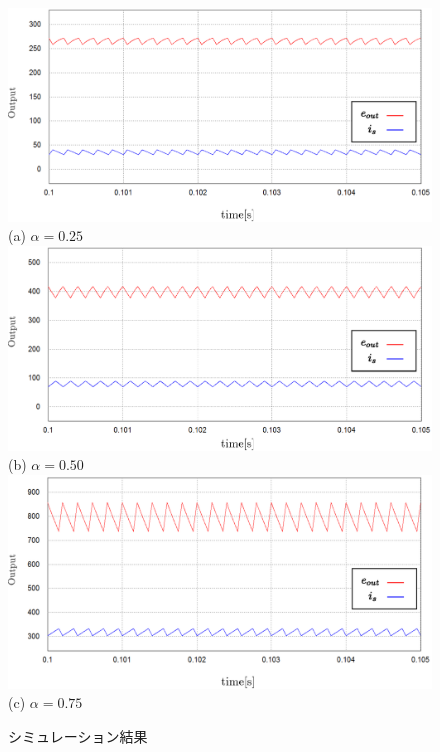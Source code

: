 \documentclass[a4paper,12pt]{jarticle}
\begin{document}
%
\begin{figure}[H]
 \centering
 \vspace{0.3cm}
 \includegraphics[scale=0.75]{../figure/eps/25.eps}\\
 (a) $ \alpha = 0.25 $ \\
 \vspace{0.3cm}
 \includegraphics[scale=0.75]{../figure/eps/50.eps}\\
 (b) $ \alpha = 0.50 $ \\
 \vspace{0.3cm}
 \includegraphics[scale=0.75]{../figure/eps/75.eps}\\
 (c) $ \alpha = 0.75 $ \\
 \caption{シミュレーション結果}
\label{result}
\end{figure}
%
%
\end{document}
